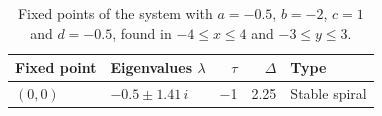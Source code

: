 \begin{table}
\centering
\caption{Fixed points of the system with $a = -0.5$, $b = -2$, $c = 1$ and $d = -0.5$, found in $-4 \le x \le 4$ and $-3 \le y \le 3$.}
\label{tab:linear-system-fixed-points}
\begin{tabular}{@{}llrrl@{}}
\toprule
Fixed point & Eigenvalues $\lambda$ & $\tau$ & $\Delta$ & Type \\
\midrule
$(\num{0}, \num{0})$ & $\num{-0.5} \pm \num{1.41}\,i$ & \num{-1} & \num{2.25} & Stable spiral \\
\bottomrule
\end{tabular}
\end{table}
